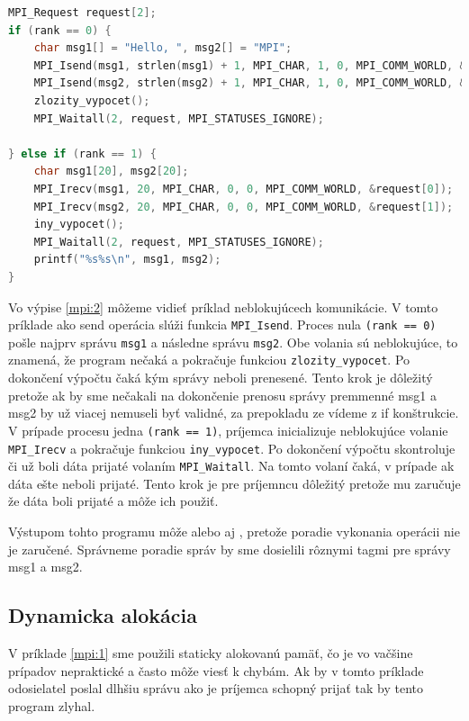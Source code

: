\begin{lstlisting}[language=c, caption={Neblokujúca komunikácia}, label={mpi:2}]
MPI_Request request[2];
if (rank == 0) {
    char msg1[] = "Hello, ", msg2[] = "MPI";
    MPI_Isend(msg1, strlen(msg1) + 1, MPI_CHAR, 1, 0, MPI_COMM_WORLD, &request[0]);
    MPI_Isend(msg2, strlen(msg2) + 1, MPI_CHAR, 1, 0, MPI_COMM_WORLD, &request[1]);
    zlozity_vypocet();
    MPI_Waitall(2, request, MPI_STATUSES_IGNORE);

} else if (rank == 1) {
    char msg1[20], msg2[20];
    MPI_Irecv(msg1, 20, MPI_CHAR, 0, 0, MPI_COMM_WORLD, &request[0]);
    MPI_Irecv(msg2, 20, MPI_CHAR, 0, 0, MPI_COMM_WORLD, &request[1]);
    iny_vypocet();
    MPI_Waitall(2, request, MPI_STATUSES_IGNORE);
    printf("%s%s\n", msg1, msg2);
}
\end{lstlisting}

Vo výpise \ref{mpi:2} môžeme vidieť príklad neblokujúcech komunikácie. V tomto príklade ako send operácia slúži funkcia \texttt{MPI\_Isend}.
Proces nula \texttt{(rank == 0)} pošle najprv správu \texttt{msg1} a následne správu \texttt{msg2}.
Obe volania sú neblokujúce, to znamená, že program nečaká
a pokračuje funkciou \texttt{zlozity\_vypocet}. Po dokončení výpočtu čaká kým správy neboli prenesené.
Tento krok je dôležitý pretože ak by sme nečakali na dokončenie prenosu správy premmenné msg1 a msg2 by už viacej nemuseli byť validné,
za prepokladu ze vídeme z if konštrukcie.
V prípade procesu jedna \texttt{(rank == 1)}, príjemca inicializuje neblokujúce volanie \texttt{MPI\_Irecv} a pokračuje funkciou \texttt{iny\_vypocet}.
Po dokončení výpočtu skontroluje či už boli dáta prijaté volaním \texttt{MPI\_Waitall}.
Na tomto volaní čaká, v prípade ak dáta ešte neboli prijaté.
Tento krok je pre príjemncu dôležitý pretože mu zaručuje že dáta boli prijaté a môže ich použiť.

Výstupom tohto programu môže  alebo aj , pretože poradie vykonania operácii nie je zaručené.
Správneme poradie správ by sme dosielili rôznymi tagmi pre správy msg1 a msg2.
\subsection{Dynamicka alokácia}
V príklade \ref{mpi:1} sme použili staticky alokovanú pamäť, čo je vo vačšine prípadov nepraktické a často môže viesť k chybám.
Ak by v tomto príklade odosielatel poslal dlhšiu správu ako je príjemca schopný prijať tak by tento program zlyhal.

